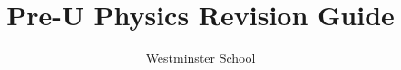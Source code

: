 \documentclass[a4paper,12pt]{memoir}
\title{Pre-U Physics Revision Guide}
\author{Westminster School}
\begin{document}
\frontmatter
\begin{titlingpage}
	\maketitle
\end{titlingpage}

\tableofcontents


\mainmatter


\backmatter
\end{document}
